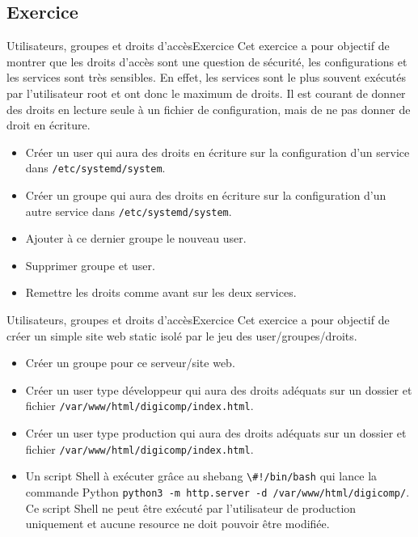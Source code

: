 \documentclass{beamer}
\begin{document}
    \subsection{Exercice}\label{subsec:user-group-rights-exercice}
    \begin{frame}{Utilisateurs, groupes et droits d'accès}{Exercice \execcounterdispinc}
        Cet exercice a pour objectif de montrer que les droits d'accès sont une question de sécurité, les configurations et les services sont très sensibles.
        En effet, les services sont le plus souvent exécutés par l'utilisateur root et ont donc le maximum de droits.
        \bigbreak
        Il est courant de donner des droits en lecture seule à un fichier de configuration, mais de ne pas donner de droit en écriture.
        \begin{itemize}
            \item Créer un user qui aura des droits en écriture sur la configuration d'un service dans \lstinline{/etc/systemd/system}.
            \item Créer un groupe qui aura des droits en écriture sur la configuration d'un autre service dans \lstinline{/etc/systemd/system}.
            \item Ajouter à ce dernier groupe le nouveau user.
            \item Supprimer groupe et user.
            \item Remettre les droits comme avant sur les deux services.
        \end{itemize}
    \end{frame}

    \begin{frame}{Utilisateurs, groupes et droits d'accès}{Exercice \execcounterdispinc}
        Cet exercice a pour objectif de créer un simple site web static isolé par le jeu des user/groupes/droits.
        \begin{itemize}
            \item Créer un groupe pour ce serveur/site web.
            \item Créer un user type développeur qui aura des droits adéquats sur un dossier et fichier \lstinline{/var/www/html/digicomp/index.html}.
            \item Créer un user type production qui aura des droits adéquats sur un dossier et fichier \lstinline{/var/www/html/digicomp/index.html}.
            \item Un script Shell à exécuter grâce au shebang \lstinline{\#!/bin/bash} qui lance la commande Python \lstinline{python3 -m http.server -d /var/www/html/digicomp/}.
            Ce script Shell ne peut être exécuté par l'utilisateur de production uniquement et aucune resource ne doit pouvoir être modifiée.
        \end{itemize}
    \end{frame}
\end{document}
